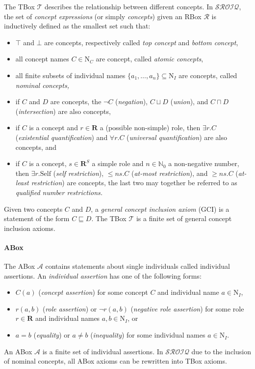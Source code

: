 The TBox $\mathcal{T}$ describes the relationship between different concepts. In $\mathcal{SROIQ}$, the set of \emph{concept expressions} (or simply \emph{concepts}) given an RBox $\mathcal{R}$ is inductively defined as the smallest set such that:

\begin{itemize}
    \item $\top$ and $\bot$ are concepts, respectively called \emph{top concept} and \emph{bottom concept},
    \item all concept names $C \in \mathrm{N}_C$ are concept, called \emph{atomic concepts},
    \item all finite subsets of individual names $\{ a_1, \dots, a_n \} \subseteq \mathrm{N}_I$ are concepts, called \emph{nominal concepts,}
    \item if $C$ and $D$ are concepts, the $\lnot C$ (\emph{negation}), $C \sqcup D$ (\emph{union}), and $C \sqcap D$ (\emph{intersection}) are also concepts,
    \item if $C$ is a concept and $r \in \mathbf{R}$ a (possible non-simple) role, then $\exists r . C$ (\emph{existential quantification}) and $\forall r . C$ (\emph{universal quantification}) are also concepts, and
    \item if $C$ is a concept, $s \in \mathbf{R}^S$ a simple role and $n \in \mathbb{N}_0$ a non-negative number, then $\exists r . \mathrm{Self}$ (\emph{self restriction}), $\leq n s . C$ (\emph{at-most restriction}), and $\geq n s. C$ (\emph{at-least restriction}) are concepts, the last two may together be referred to as \emph{qualified number restrictions.}
\end{itemize}

Given two concepts $C$ and $D$, a \emph{general concept inclusion axiom} (GCI) is a statement of the form $C \sqsubseteq D$. The TBox $\mathcal{T}$ is a finite set of general concept inclusion axioms.

\paragraph{ABox} \label{abox}

The ABox $\mathcal{A}$ contains statements about single individuals called individual assertions. An \emph{individual assertion} has one of the following forms:

\begin{itemize}
    \item $C(a)$ (\emph{concept assertion}) for some concept $C$ and individual name $a \in \mathrm{N}_I$,
    \item $r(a, b)$ (\emph{role assertion}) or $\lnot r (a, b)$ (\emph{negative role assertion}) for some role $r \in \mathbf{R}$ and individual names $a, b \in \mathrm{N}_I$, or
    \item $a = b$ (\emph{equality}) or $a \not = b$ (\emph{inequality}) for some individual names $a \in \mathrm{N}_I$.
\end{itemize}

An ABox $\mathcal{A}$ is a finite set of individual assertions. In $\mathcal{SROIQ}$ due to the inclusion of nominal concepts, all ABox axioms can be rewritten into TBox axioms.
